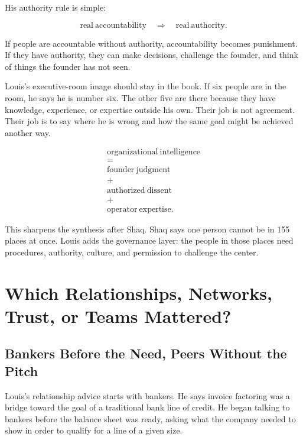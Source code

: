 \documentclass[11pt,oneside]{book}
\begin{document}
His authority rule is simple:

\begin{equation}
\mathrm{real\ accountability}
\quad\Rightarrow\quad
\mathrm{real\ authority}.
\end{equation}

If people are accountable without authority, accountability becomes punishment. If they have authority, they can make decisions, challenge the founder, and think of things the founder has not seen.

Louis's executive-room image should stay in the book. If six people are in the room, he says he is number six. The other five are there because they have knowledge, experience, or expertise outside his own. Their job is not agreement. Their job is to say where he is wrong and how the same goal might be achieved another way.

\begin{equation}
\begin{gathered}
\mathrm{organizational\ intelligence}\\
=\\
\mathrm{founder\ judgment}\\
+\\
\mathrm{authorized\ dissent}\\
+\\
\mathrm{operator\ expertise}.
\end{gathered}
\end{equation}

This sharpens the synthesis after Shaq. Shaq says one person cannot be in 155 places at once. Louis adds the governance layer: the people in those places need procedures, authority, culture, and permission to challenge the center.

\chapter{Which Relationships, Networks, Trust, or Teams Mattered?}

\section{Bankers Before the Need, Peers Without the Pitch}

Louis's relationship advice starts with bankers. He says invoice factoring was a bridge toward the goal of a traditional bank line of credit. He began talking to bankers before the balance sheet was ready, asking what the company needed to show in order to qualify for a line of a given size.
\end{document}
